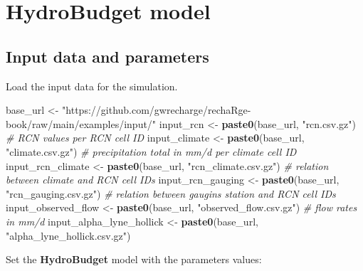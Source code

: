\documentclass[
]{book}
\newenvironment{Shaded}{\begin{snugshade}}{\end{snugshade}}
\newcommand{\CommentTok}[1]{\textcolor[rgb]{0.56,0.35,0.01}{\textit{#1}}}
\newcommand{\FunctionTok}[1]{\textcolor[rgb]{0.13,0.29,0.53}{\textbf{#1}}}
\newcommand{\NormalTok}[1]{#1}
\newcommand{\OtherTok}[1]{\textcolor[rgb]{0.56,0.35,0.01}{#1}}
\newcommand{\StringTok}[1]{\textcolor[rgb]{0.31,0.60,0.02}{#1}}
\begin{document}
\hypertarget{hydrobudget-model}{%
\section{HydroBudget model}\label{hydrobudget-model}}

\hypertarget{input-data-and-parameters}{%
\subsection{Input data and parameters}\label{input-data-and-parameters}}

Load the input data for the simulation.

\begin{Shaded}
\begin{Highlighting}[]
\NormalTok{base\_url }\OtherTok{\textless{}{-}} \StringTok{"https://github.com/gwrecharge/rechaRge{-}book/raw/main/examples/input/"}
\NormalTok{input\_rcn }\OtherTok{\textless{}{-}} \FunctionTok{paste0}\NormalTok{(base\_url, }\StringTok{"rcn.csv.gz"}\NormalTok{) }\CommentTok{\# RCN values per RCN cell ID}
\NormalTok{input\_climate }\OtherTok{\textless{}{-}} \FunctionTok{paste0}\NormalTok{(base\_url, }\StringTok{"climate.csv.gz"}\NormalTok{) }\CommentTok{\# precipitation total in mm/d per climate cell ID}
\NormalTok{input\_rcn\_climate }\OtherTok{\textless{}{-}} \FunctionTok{paste0}\NormalTok{(base\_url, }\StringTok{"rcn\_climate.csv.gz"}\NormalTok{) }\CommentTok{\# relation between climate and RCN cell IDs}
\NormalTok{input\_rcn\_gauging }\OtherTok{\textless{}{-}} \FunctionTok{paste0}\NormalTok{(base\_url, }\StringTok{"rcn\_gauging.csv.gz"}\NormalTok{) }\CommentTok{\# relation between gaugins station and RCN cell IDs}
\NormalTok{input\_observed\_flow }\OtherTok{\textless{}{-}} \FunctionTok{paste0}\NormalTok{(base\_url, }\StringTok{"observed\_flow.csv.gz"}\NormalTok{) }\CommentTok{\# flow rates in mm/d}
\NormalTok{input\_alpha\_lyne\_hollick }\OtherTok{\textless{}{-}} \FunctionTok{paste0}\NormalTok{(base\_url, }\StringTok{"alpha\_lyne\_hollick.csv.gz"}\NormalTok{)}
\end{Highlighting}
\end{Shaded}

Set the \textbf{HydroBudget} model with the parameters values:
\end{document}
